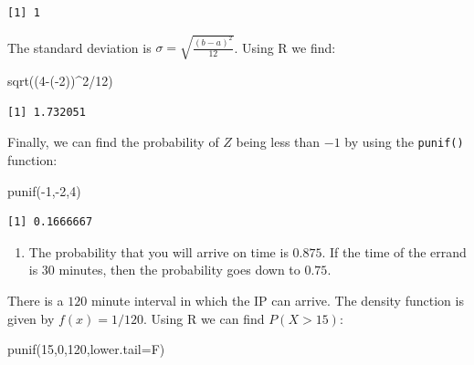 \documentclass[
  letterpaper,
  DIV=11,
  numbers=noendperiod]{scrreprt}
\newenvironment{Shaded}{\begin{snugshade}}{\end{snugshade}}
\newcommand{\AttributeTok}[1]{\textcolor[rgb]{0.40,0.45,0.13}{#1}}
\newcommand{\DecValTok}[1]{\textcolor[rgb]{0.68,0.00,0.00}{#1}}
\newcommand{\FunctionTok}[1]{\textcolor[rgb]{0.28,0.35,0.67}{#1}}
\newcommand{\NormalTok}[1]{\textcolor[rgb]{0.00,0.23,0.31}{#1}}
\newcommand{\SpecialCharTok}[1]{\textcolor[rgb]{0.37,0.37,0.37}{#1}}
\providecommand{\tightlist}{%
  \setlength{\itemsep}{0pt}\setlength{\parskip}{0pt}}\usepackage{longtable,booktabs,array}
\begin{document}
\begin{verbatim}
[1] 1
\end{verbatim}

The standard deviation is \(\sigma = \sqrt {\frac{(b-a)^2}{12}}\). Using
R we find:

\begin{Shaded}
\begin{Highlighting}[numbers=left,,]
\FunctionTok{sqrt}\NormalTok{((}\DecValTok{4}\SpecialCharTok{{-}}\NormalTok{(}\SpecialCharTok{{-}}\DecValTok{2}\NormalTok{))}\SpecialCharTok{\^{}}\DecValTok{2}\SpecialCharTok{/}\DecValTok{12}\NormalTok{)}
\end{Highlighting}
\end{Shaded}

\begin{verbatim}
[1] 1.732051
\end{verbatim}

Finally, we can find the probability of \(Z\) being less than \(-1\) by
using the \texttt{punif()} function:

\begin{Shaded}
\begin{Highlighting}[numbers=left,,]
\FunctionTok{punif}\NormalTok{(}\SpecialCharTok{{-}}\DecValTok{1}\NormalTok{,}\SpecialCharTok{{-}}\DecValTok{2}\NormalTok{,}\DecValTok{4}\NormalTok{)}
\end{Highlighting}
\end{Shaded}

\begin{verbatim}
[1] 0.1666667
\end{verbatim}

\begin{enumerate}
\def\labelenumi{\arabic{enumi}.}
\setcounter{enumi}{1}
\tightlist
\item
  The probability that you will arrive on time is \(0.875\). If the time
  of the errand is 30 minutes, then the probability goes down to
  \(0.75\).
\end{enumerate}

There is a \(120\) minute interval in which the IP can arrive. The
density function is given by \(f(x)=1/120\). Using R we can find
\(P(X>15)\):

\begin{Shaded}
\begin{Highlighting}[numbers=left,,]
\FunctionTok{punif}\NormalTok{(}\DecValTok{15}\NormalTok{,}\DecValTok{0}\NormalTok{,}\DecValTok{120}\NormalTok{,}\AttributeTok{lower.tail=}\NormalTok{F)}
\end{Highlighting}
\end{Shaded}
\end{document}
